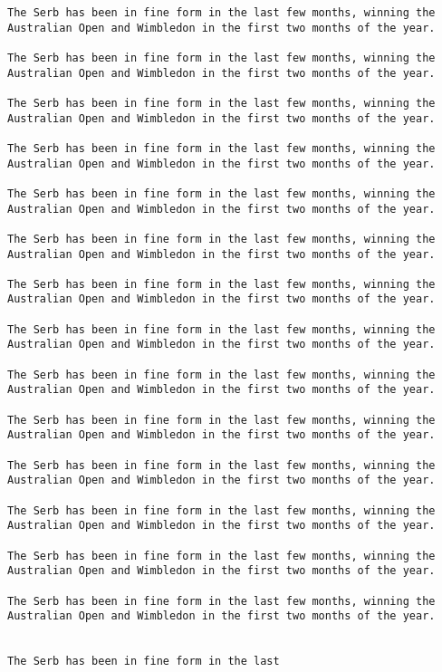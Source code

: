 \begin{lstlisting}
The Serb has been in fine form in the last few months, winning the Australian Open and Wimbledon in the first two months of the year.

The Serb has been in fine form in the last few months, winning the Australian Open and Wimbledon in the first two months of the year.

The Serb has been in fine form in the last few months, winning the Australian Open and Wimbledon in the first two months of the year.

The Serb has been in fine form in the last few months, winning the Australian Open and Wimbledon in the first two months of the year.

The Serb has been in fine form in the last few months, winning the Australian Open and Wimbledon in the first two months of the year.

The Serb has been in fine form in the last few months, winning the Australian Open and Wimbledon in the first two months of the year.

The Serb has been in fine form in the last few months, winning the Australian Open and Wimbledon in the first two months of the year.

The Serb has been in fine form in the last few months, winning the Australian Open and Wimbledon in the first two months of the year.

The Serb has been in fine form in the last few months, winning the Australian Open and Wimbledon in the first two months of the year.

The Serb has been in fine form in the last few months, winning the Australian Open and Wimbledon in the first two months of the year.

The Serb has been in fine form in the last few months, winning the Australian Open and Wimbledon in the first two months of the year.

The Serb has been in fine form in the last few months, winning the Australian Open and Wimbledon in the first two months of the year.

The Serb has been in fine form in the last few months, winning the Australian Open and Wimbledon in the first two months of the year.

The Serb has been in fine form in the last few months, winning the Australian Open and Wimbledon in the first two months of the year.


The Serb has been in fine form in the last
\end{lstlisting}


